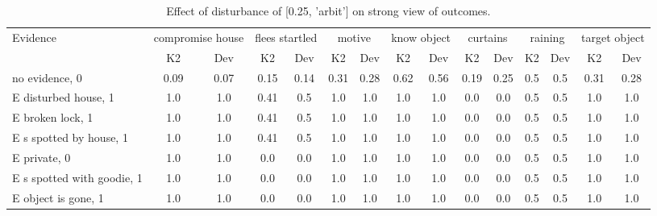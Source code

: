 \begin{table}\begin{tabular}{l|cc|cc|cc|cc|cc|cc|cc}\toprule\multirow{2}{*}{Evidence} & \multicolumn{2}{c}{compromise house}& \multicolumn{2}{c}{flees startled}& \multicolumn{2}{c}{motive}& \multicolumn{2}{c}{know object}& \multicolumn{2}{c}{curtains}& \multicolumn{2}{c}{raining}& \multicolumn{2}{c}{target object}\\& {K2} & {Dev}& {K2} & {Dev}& {K2} & {Dev}& {K2} & {Dev}& {K2} & {Dev}& {K2} & {Dev}& {K2} & {Dev}\\\midrule
no evidence, 0 & 0.09&0.07&0.15&0.14&0.31&0.28&\cellcolor{Bittersweet}0.62&\cellcolor{Bittersweet}0.56&\cellcolor{Bittersweet}0.19&\cellcolor{Bittersweet}0.25&0.5&0.5&0.31&0.28\\E disturbed house, 1 & 1.0&1.0&\cellcolor{Bittersweet}0.41&\cellcolor{Bittersweet}0.5&1.0&1.0&1.0&1.0&0.0&0.0&0.5&0.5&1.0&1.0\\E broken lock, 1 & 1.0&1.0&\cellcolor{Bittersweet}0.41&\cellcolor{Bittersweet}0.5&1.0&1.0&1.0&1.0&0.0&0.0&0.5&0.5&1.0&1.0\\E s spotted by house, 1 & 1.0&1.0&\cellcolor{Bittersweet}0.41&\cellcolor{Bittersweet}0.5&1.0&1.0&1.0&1.0&0.0&0.0&0.5&0.5&1.0&1.0\\E private, 0 & 1.0&1.0&0.0&0.0&1.0&1.0&1.0&1.0&0.0&0.0&0.5&0.5&1.0&1.0\\E s spotted with goodie, 1 & 1.0&1.0&0.0&0.0&1.0&1.0&1.0&1.0&0.0&0.0&0.5&0.5&1.0&1.0\\E object is gone, 1 & 1.0&1.0&0.0&0.0&1.0&1.0&1.0&1.0&0.0&0.0&0.5&0.5&1.0&1.0\\\bottomrule\end{tabular}\caption{Effect of disturbance of [0.25, 'arbit'] on strong view of outcomes.}\end{table}
